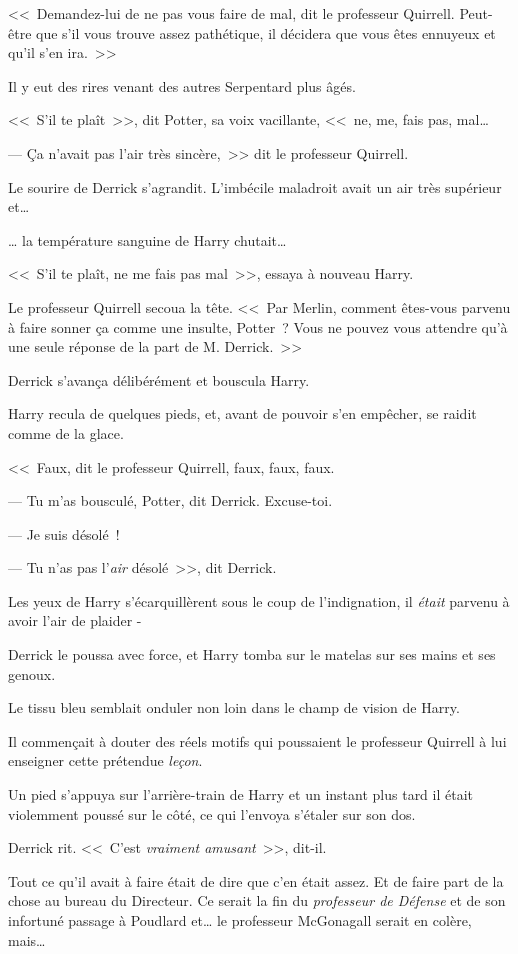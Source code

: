 <<~Demandez-lui de ne pas vous faire de mal, dit le professeur Quirrell. Peut-être que s'il vous trouve assez pathétique, il décidera que vous êtes ennuyeux et qu'il s'en ira.~>>

Il y eut des rires venant des autres Serpentard plus âgés.

<<~S'il te plaît~>>, dit Potter, sa voix vacillante, <<~ne, me, fais pas, mal…

--- Ça n'avait pas l'air très sincère,~>> dit le professeur Quirrell.

Le sourire de Derrick s'agrandit. L'imbécile maladroit avait un air très supérieur et…

… la température sanguine de Harry chutait…

<<~S'il te plaît, ne me fais pas mal~>>, essaya à nouveau Harry.

Le professeur Quirrell secoua la tête. <<~Par Merlin, comment êtes-vous parvenu à faire sonner ça comme une insulte, Potter~? Vous ne pouvez vous attendre qu'à une seule réponse de la part de M. Derrick.~>>

Derrick s'avança délibérément et bouscula Harry.

Harry recula de quelques pieds, et, avant de pouvoir s'en empêcher, se raidit comme de la glace.

<<~Faux, dit le professeur Quirrell, faux, faux, faux.

--- Tu m'as bousculé, Potter, dit Derrick. Excuse-toi.

--- Je suis désolé~!

--- Tu n'as pas l'\emph{air} désolé~>>, dit Derrick.

Les yeux de Harry s'écarquillèrent sous le coup de l'indignation, il \emph{était} parvenu à avoir l'air de plaider -

Derrick le poussa avec force, et Harry tomba sur le matelas sur ses mains et ses genoux.

Le tissu bleu semblait onduler non loin dans le champ de vision de Harry.

Il commençait à douter des réels motifs qui poussaient le professeur Quirrell à lui enseigner cette prétendue \emph{leçon}.

Un pied s'appuya sur l'arrière-train de Harry et un instant plus tard il était violemment poussé sur le côté, ce qui l'envoya s'étaler sur son dos.

Derrick rit. <<~C'est \emph{vraiment amusant}~>>, dit-il.

Tout ce qu'il avait à faire était de dire que c'en était assez. Et de faire part de la chose au bureau du Directeur. Ce serait la fin du \emph{professeur de Défense} et de son infortuné passage à Poudlard et… le professeur McGonagall serait en colère, mais…

